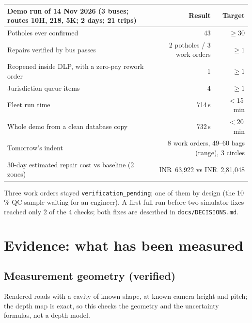 \documentclass[11pt,a4paper]{article}
\newcommand{\code}[1]{\texttt{\small #1}}
\newcommand{\INR}{INR~}
\begin{document}
\begin{center}
\begin{tabularx}{\textwidth}{@{}X r r@{}}
\toprule
\textbf{Demo run of 14 Nov 2026} (3 buses; routes 10H, 218, 5K; 2 days; 21 trips) & \textbf{Result} & \textbf{Target}\\
\midrule
Potholes ever confirmed & 43 & $\ge30$\\
Repairs verified by bus passes & 2 potholes / 3 work orders & $\ge1$\\
Reopened inside DLP, with a zero-pay rework order & 1 & $\ge1$\\
Jurisdiction-queue items & 4 & $\ge1$\\
Fleet run time & 714\,s & $<15$\,min\\
Whole demo from a clean database copy & 732\,s & $<20$\,min\\
\midrule
Tomorrow's indent & \multicolumn{2}{r}{8 work orders, 49--60 bags (range), 3 circles}\\
30-day estimated repair cost vs baseline (2 zones) & \multicolumn{2}{r}{\INR63,922 vs \INR2,81,048}\\
\bottomrule
\end{tabularx}
\end{center}
Three work orders stayed \code{verification\_pending}; one of them by design (the 10\,\% QC sample waiting for an
engineer). A first full run before two simulator fixes reached only 2 of the 4 checks; both fixes are described in
\code{docs/DECISIONS.md}.

\section{Evidence: what has been measured}\label{sec:evidence}

\subsection{Measurement geometry (verified)}
Rendered roads with a cavity of known shape, at known camera height and pitch; the depth map is exact, so this
checks the geometry and the uncertainty formulas, not a depth model.
\end{document}
